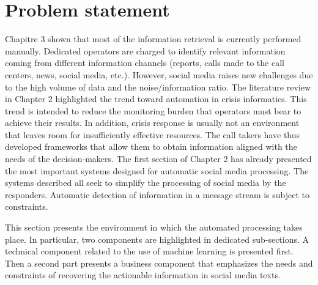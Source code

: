 \section{Problem statement}
Chapitre 3 shown that most of the information retrieval is currently performed manually.
Dedicated operators are charged to identify relevant information coming from different information channels (reports, calls made to the call centers, news, social media, etc.).
However, social media raises new challenges due to the high volume of data and the noise/information ratio.
The literature review in Chapter 2 highlighted the trend toward automation in crisis informatics.
This trend is intended to reduce the monitoring burden that operators must bear to achieve their results.
In addition, crisis response is usually not an environment that leaves room for insufficiently effective resources.
The call takers have thus developed frameworks that allow them to obtain information aligned with the needs of the decision-makers.
The first section of Chapter 2 has already presented the most important systems designed for automatic social media processing.
The systems described all seek to simplify the processing of social media by the responders.
Automatic detection of information in a message stream is subject to constraints.

This section presents the environment in which the automated processing takes place.
In particular, two components are highlighted in dedicated sub-sections.
A technical component related to the use of machine learning is presented first.
Then a second part presents a business component that emphasizes the needs and constraints of recovering the actionable information in social media texts.

